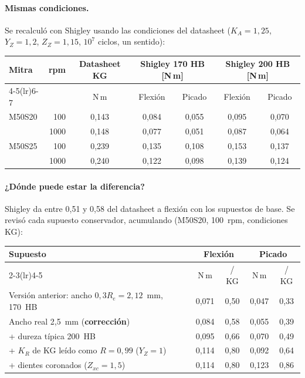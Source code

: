 \documentclass[11pt,a4paper]{article}
\begin{document}
\paragraph{Mismas condiciones.} Se recalculó con Shigley usando las condiciones del datasheet
($K_A=1{,}25$, $Y_Z=1{,}2$, $Z_Z=1{,}15$, $10^7$ ciclos, un sentido):

\begin{table}[H]\centering\small\setlength{\tabcolsep}{5pt}
\begin{tabular}{l r c cc cc}
\toprule
Mitra & rpm & Datasheet KG & \multicolumn{2}{c}{Shigley 170 HB [N\,m]} & \multicolumn{2}{c}{Shigley 200 HB [N\,m]}\\
\cmidrule(lr){4-5}\cmidrule(lr){6-7}
 & & N\,m & Flexión & Picado & Flexión & Picado\\
\midrule
M50S20 & 100  & 0,143 & 0,084 & 0,055 & 0,095 & 0,070\\
       & 1000 & 0,148 & 0,077 & 0,051 & 0,087 & 0,064\\
M50S25 & 100  & 0,239 & 0,135 & 0,108 & 0,153 & 0,137\\
       & 1000 & 0,240 & 0,122 & 0,098 & 0,139 & 0,124\\
\bottomrule
\end{tabular}
\end{table}

\paragraph{¿Dónde puede estar la diferencia?} Shigley da entre 0,51 y 0,58 del datasheet a flexión con los supuestos
de base. Se revisó cada supuesto conservador, acumulando (M50S20, 100~rpm, condiciones KG):

\begin{table}[H]\centering\small\setlength{\tabcolsep}{5pt}
\begin{tabular}{l cc cc}
\toprule
Supuesto & \multicolumn{2}{c}{Flexión} & \multicolumn{2}{c}{Picado}\\
\cmidrule(lr){2-3}\cmidrule(lr){4-5}
 & N\,m & / KG & N\,m & / KG\\
\midrule
Versión anterior: ancho $0{,}3R_e=2{,}12$~mm, 170~HB & 0,071 & 0,50 & 0,047 & 0,33\\
Ancho real 2,5~mm (\textbf{corrección}) & 0,084 & 0,58 & 0,055 & 0,39\\
+ dureza típica 200~HB & 0,095 & 0,66 & 0,070 & 0,49\\
+ $K_R$ de KG leído como $R=0{,}99$ ($Y_Z=1$) & 0,114 & 0,80 & 0,092 & 0,64\\
+ dientes coronados ($Z_{xc}=1{,}5$) & 0,114 & 0,80 & 0,123 & 0,86\\
\bottomrule
\end{tabular}
\end{table}
\end{document}
